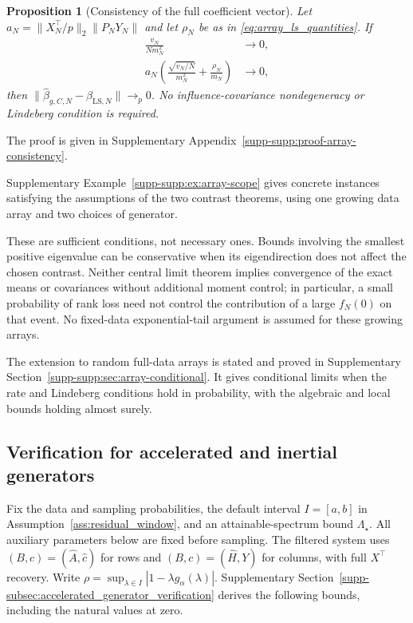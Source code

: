 \documentclass[pdflatex,iicol,sn-mathphys-ay]{sn-jnl}
\theoremstyle{thmstyleone}
\newtheorem{proposition}{Proposition}
\theoremstyle{thmstylethree}
\theoremstyle{thmstyletwo}
\begin{document}
\begin{proposition}[Consistency of the full coefficient vector]
\label{prop:array_consistency}
Let \(a_N=\|X_N^\top/p\|_2\|P_NY_N\|\) and let \(\rho_N\) be as in
\eqref{eq:array_ls_quantities}. If
\[
 \begin{aligned}
 \frac{v_N}{Nm_N^2}&\to0,\\
 a_N\left(\frac{\sqrt{v_N/N}}{m_N^2}+\frac{\rho_N}{m_N}\right)&\to0,
 \end{aligned}
\]
then \(\|\widehat\beta_{g,C,N}-\beta_{\mathrm{LS},N}\|\to_p0\).
No influence-covariance nondegeneracy or Lindeberg condition is required.
\end{proposition}
The proof is given in Supplementary Appendix~\ref{supp-supp:proof-array-consistency}.

Supplementary Example~\ref{supp-supp:ex:array-scope} gives concrete instances
satisfying the assumptions of the two contrast theorems, using one growing
data array and two choices of generator.

These are sufficient conditions, not necessary ones. Bounds involving the
smallest positive eigenvalue can be conservative when its eigendirection
does not affect the chosen contrast. Neither central limit theorem implies
convergence of the exact means or covariances without additional moment
control; in particular, a small probability of rank loss need not control
the contribution of a large \(f_N(0)\) on that event.
No fixed-data exponential-tail argument is assumed for these growing arrays.

The extension to random full-data arrays is stated and proved in
Supplementary Section~\ref{supp-supp:sec:array-conditional}. It gives
conditional limits when the rate and Lindeberg conditions hold in
probability, with the algebraic and local bounds holding almost surely.

\subsection{Verification for accelerated and inertial generators}
\label{subsec:accelerated_generator_verification}
Fix the data and sampling probabilities, the default interval $I=[a,b]$
in Assumption~\ref{ass:residual_window}, and an attainable-spectrum bound
$\Lambda_\star$. All auxiliary parameters below are fixed before sampling.
The filtered system uses $(B,c)=(\widehat A,\widehat c)$ for rows and
$(B,c)=(\widehat H,Y)$ for columns, with full $X^\top$ recovery.
Write $\rho=\sup_{\lambda\in I}|1-\lambda g_\alpha(\lambda)|$.
Supplementary Section~\ref{supp-subsec:accelerated_generator_verification}
derives the following bounds, including the natural values at zero.
\end{document}
